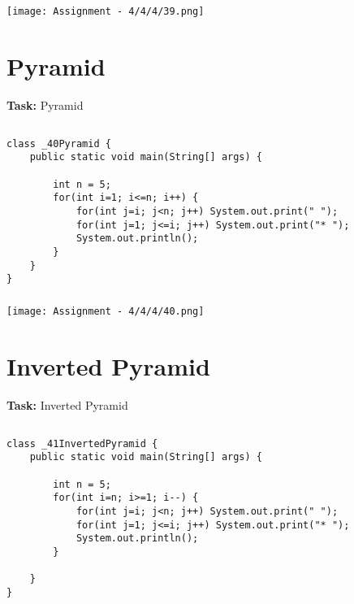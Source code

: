 \documentclass[12pt,a4paper]{article}
\begin{document}
\subsubsection{}
\begin{center}
    \texttt{[image: Assignment - 4/4/4/39.png]}
\end{center}


\section{Pyramid}
\textbf{Task:} Pyramid

\subsection{}
\begin{lstlisting}
class _40Pyramid {
    public static void main(String[] args) {
    
        int n = 5;
        for(int i=1; i<=n; i++) {
            for(int j=i; j<n; j++) System.out.print(" ");
            for(int j=1; j<=i; j++) System.out.print("* ");
            System.out.println();
        }
    }
}
\end{lstlisting}

\subsubsection{}
\begin{center}
    \texttt{[image: Assignment - 4/4/4/40.png]}
\end{center}


\section{Inverted Pyramid}
\textbf{Task:} Inverted Pyramid

\subsection{}
\begin{lstlisting}
class _41InvertedPyramid {
    public static void main(String[] args) {
    
        int n = 5;
        for(int i=n; i>=1; i--) {
            for(int j=i; j<n; j++) System.out.print(" ");
            for(int j=1; j<=i; j++) System.out.print("* ");
            System.out.println();
        }
    
    }
}
\end{lstlisting}
\end{document}
